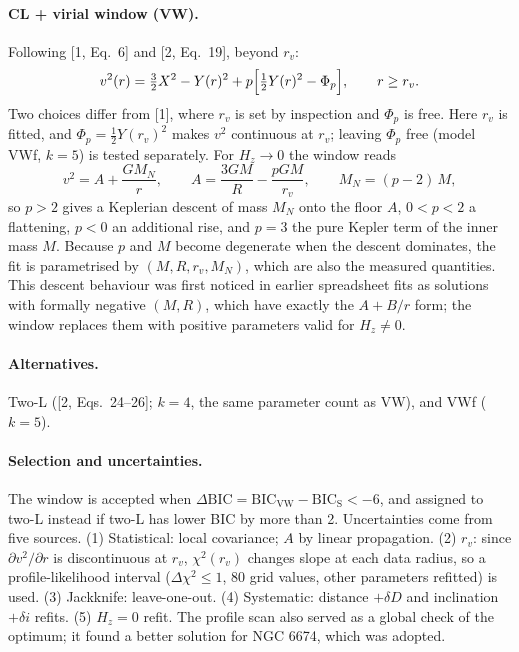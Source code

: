 \documentclass[10pt]{article}
\begin{document}
\paragraph{CL + virial window (VW).} Following [1, Eq.~6] and [2, Eq.~19], beyond $r_v$:
\begin{equation*}v^2(r)=\tfrac32X^2-Y(r)^2+p\Bigl[\tfrac12Y(r)^2-\Phi_p\Bigr],\qquad r\ge r_v.\end{equation*}
Two choices differ from [1], where $r_v$ is set by inspection and $\Phi_p$ is free. Here $r_v$ is fitted, and $\Phi_p=\tfrac12Y(r_v)^2$ makes $v^2$ continuous at $r_v$; leaving $\Phi_p$ free (model VWf, $k=5$) is tested separately. For $H_z\to0$ the window reads
\begin{equation*}v^2=A+\frac{GM_N}{r},\qquad A=\frac{3GM}{R}-\frac{pGM}{r_v},\qquad M_N=(p-2)\,M,\end{equation*}
so $p>2$ gives a Keplerian descent of mass $M_N$ onto the floor $A$, $0<p<2$ a flattening, $p<0$ an additional rise, and $p=3$ the pure Kepler term of the inner mass $M$. Because $p$ and $M$ become degenerate when the descent dominates, the fit is parametrised by $(M,R,r_v,M_N)$, which are also the measured quantities. This descent behaviour was first noticed in earlier spreadsheet fits as solutions with formally negative $(M,R)$, which have exactly the $A+B/r$ form; the window replaces them with positive parameters valid for $H_z\neq0$.
\paragraph{Alternatives.} Two-L ([2, Eqs.~24--26]; $k=4$, the same parameter count as VW), and VWf ($k=5$).
\paragraph{Selection and uncertainties.} The window is accepted when $\Delta\mathrm{BIC}=\mathrm{BIC_{VW}}-\mathrm{BIC_S}<-6$, and assigned to two-L instead if two-L has lower BIC by more than 2. Uncertainties come from five sources. (1) Statistical: local covariance; $A$ by linear propagation. (2) $r_v$: since $\partial v^2/\partial r$ is discontinuous at $r_v$, $\chi^2(r_v)$ changes slope at each data radius, so a profile-likelihood interval ($\Delta\chi^2\le1$, 80 grid values, other parameters refitted) is used. (3) Jackknife: leave-one-out. (4) Systematic: distance $+\delta D$ and inclination $+\delta i$ refits. (5) $H_z=0$ refit. The profile scan also served as a global check of the optimum; it found a better solution for NGC 6674, which was adopted.
\end{document}
